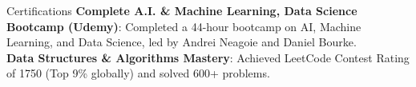 \documentclass{resume}
\begin{document}
    \begin{rSection}{Certifications}
    \textbf{Complete A.I. \& Machine Learning, Data Science Bootcamp (Udemy)}: Completed a 44-hour bootcamp on AI, Machine Learning, and Data Science, led by Andrei Neagoie and Daniel Bourke.\\
\textbf{Data Structures \& Algorithms Mastery}: Achieved LeetCode Contest Rating of 1750 (Top 9\% globally) and solved 600+ problems.\\
    \end{rSection}

    
\end{document}
